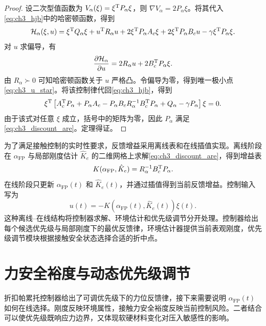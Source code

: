 \begin{proof}
设二次型值函数为 $V_\alpha(\xi)=\xi^{\mathrm{T}}P_\alpha\xi$，则 $\nabla V_\alpha=2P_\alpha\xi$。将其代入\eqref{eq:ch3_hjb}中的哈密顿函数，得到
\begin{equation}
  \mathcal{H}_\alpha(\xi,u)=\xi^{\mathrm{T}}Q_\alpha\xi+u^{\mathrm{T}}R_\alpha u+2\xi^{\mathrm{T}}P_\alpha A_c\xi+2\xi^{\mathrm{T}}P_\alpha B_cu-\gamma\xi^{\mathrm{T}}P_\alpha\xi .
\end{equation}
对 $u$ 求偏导，有
\begin{equation}
  \frac{\partial\mathcal{H}_\alpha}{\partial u}=2R_\alpha u+2B_c^{\mathrm{T}}P_\alpha\xi .
\end{equation}
由 $R_\alpha\succ0$ 可知哈密顿函数关于 $u$ 严格凸。令偏导为零，得到唯一极小点\eqref{eq:ch3_u_star}。将该控制律代回\eqref{eq:ch3_hjb}，得到
\begin{equation}
  \xi^{\mathrm{T}}\left[A_c^{\mathrm{T}}P_\alpha+P_\alpha A_c-P_\alpha B_cR_\alpha^{-1}B_c^{\mathrm{T}}P_\alpha+Q_\alpha-\gamma P_\alpha\right]\xi=0 .
\end{equation}
由于该式对任意 $\xi$ 成立，括号中的矩阵为零，因此 $P_\alpha$ 满足\eqref{eq:ch3_discount_are}。定理得证。
\end{proof}

为了满足接触控制的实时性要求，反馈增益采用离线表和在线插值实现。离线阶段在 $\alpha_{\mathrm{FP}}$ 与局部刚度估计 $\hat K_e$ 的二维网格上求解\eqref{eq:ch3_discount_are}，得到增益表
\begin{equation}
  K(\alpha_{\mathrm{FP}},\hat K_e)=R_\alpha^{-1}B_c^{\mathrm{T}}P_\alpha .
  \label{eq:ch3_gain_table}
\end{equation}
在线阶段只更新 $\alpha_{\mathrm{FP}}(t)$ 和 $\hat K_e(t)$，并通过插值得到当前反馈增益。控制输入写为
\begin{equation}
  u(t)=-K(\alpha_{\mathrm{FP}}(t),\hat K_e(t))\xi(t).
  \label{eq:ch3_control_law}
\end{equation}
这种离线--在线结构将控制器求解、环境估计和优先级调节分开处理。控制器给出每个候选优先级与局部刚度下的最优反馈律，环境估计器提供当前表观刚度，优先级调节模块根据接触安全状态选择合适的折中点。

\section{力安全裕度与动态优先级调节}
\label{sec:ch3_priority}

折扣帕累托控制器给出了可调优先级下的力位反馈律，接下来需要说明 $\alpha_{\mathrm{FP}}(t)$ 如何在线选择。刚度反映环境属性，接触力安全裕度反映当前控制风险。二者结合可以使优先级既响应力边界，又体现软硬材料变化对压入敏感性的影响。

